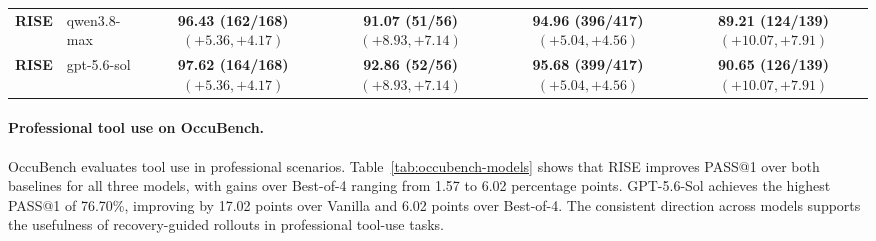 \documentclass{article}
\begin{document}
\begin{table}[!htb]
\begin{tabular*}{\linewidth}{@{\extracolsep{\fill}}llcccc@{}}
\textbf{RISE} & qwen3.8-max & \shortstack[c]{\textbf{96.43 (162/168)}\\[-1pt]{\scriptsize $(+5.36,+4.17)$}} & \shortstack[c]{\textbf{91.07 (51/56)}\\[-1pt]{\scriptsize $(+8.93,+7.14)$}} & \shortstack[c]{\textbf{94.96 (396/417)}\\[-1pt]{\scriptsize $(+5.04,+4.56)$}} & \shortstack[c]{\textbf{89.21 (124/139)}\\[-1pt]{\scriptsize $(+10.07,+7.91)$}} \\
\textbf{RISE} & gpt-5.6-sol & \shortstack[c]{\textbf{97.62 (164/168)}\\[-1pt]{\scriptsize $(+5.36,+4.17)$}} & \shortstack[c]{\textbf{92.86 (52/56)}\\[-1pt]{\scriptsize $(+8.93,+7.14)$}} & \shortstack[c]{\textbf{95.68 (399/417)}\\[-1pt]{\scriptsize $(+5.04,+4.56)$}} & \shortstack[c]{\textbf{90.65 (126/139)}\\[-1pt]{\scriptsize $(+10.07,+7.91)$}} \\
\bottomrule
\end{tabular*}
\end{table}

\paragraph{Professional tool use on OccuBench.} OccuBench evaluates tool use in professional scenarios. Table~\ref{tab:occubench-models} shows that RISE improves PASS@1 over both baselines for all three models, with gains over Best-of-4 ranging from 1.57 to 6.02 percentage points. GPT-5.6-Sol achieves the highest PASS@1 of 76.70\%, improving by 17.02 points over Vanilla and 6.02 points over Best-of-4. The consistent direction across models supports the usefulness of recovery-guided rollouts in professional tool-use tasks.
\end{document}
